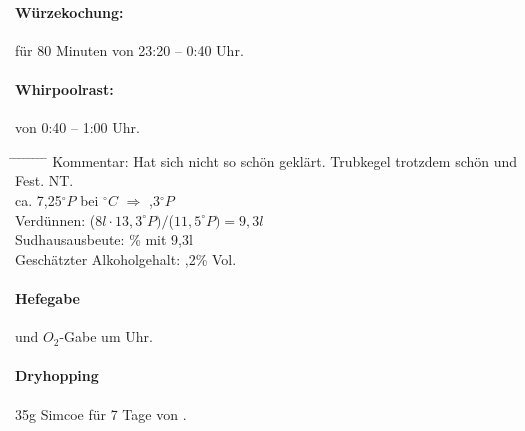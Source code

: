 \documentclass[12pt,oneside,a4paper]{scrartcl}
\begin{document}
{\paragraph{Würzekochung:} für 80 Minuten von 23:20 -- 0:40 Uhr.\\
\paragraph{Whirpoolrast:} von 0:40 -- 1:00 Uhr.
	\begin{tabbing}
		\hspace{1cm} \= \hspace{1cm} \= \hspace{1cm} \= \hspace{1cm} \= \hspace{1cm} \= \hspace{1cm} \= \hspace{1cm} \= \hspace{1cm} \= \kill
		\> Kommentar: \>\>\> Hat sich nicht so schön geklärt. Trubkegel trotzdem schön und Fest. NT.\\
		\> \> \> ca. 7,25$^\circ P$ \> \> bei $^\circ C$ \> $\Rightarrow$ ,3$^\circ P$\\
		\> \> Verdünnen: \> \> \> \> \> ($8l \cdot$$ 13,3^\circ P)/$($11,5^\circ P)= 9,3l$\\
		\> \> Sudhausausbeute: \> \> \> \> \% mit 9,3l\\
		\> \> Geschätzter Alkoholgehalt: \> \> \> \> ,2\% Vol.
	\end{tabbing}
%
\paragraph{Hefegabe} und $O_2$-Gabe um  Uhr.
\paragraph{Dryhopping} 35g Simcoe für 7 Tage von .
%
}
\end{document}
